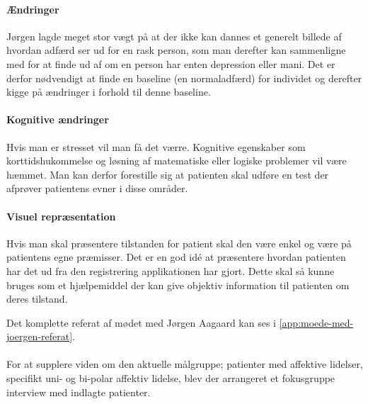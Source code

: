 \paragraph{Ændringer}
Jørgen lagde meget stor vægt på at der ikke kan dannes et generelt billede af hvordan adfærd ser ud for en rask person, som man derefter kan sammenligne med for at finde ud af om en person har enten depression eller mani.
Det er derfor nødvendigt at finde en baseline (en normaladfærd) for individet og derefter kigge på ændringer i forhold til denne baseline.

\paragraph{Kognitive ændringer}
Hvis man er stresset vil man få det værre. 
Kognitive egenskaber som korttidshukommelse og løsning af matematiske eller logiske problemer vil være hæmmet.
Man kan derfor forestille sig at patienten skal udføre en test der afprøver patientens evner i disse områder.

\paragraph{Visuel repræsentation}
Hvis man skal præsentere tilstanden for patient skal den være enkel og være på patientens egne præmisser. Det er en god idé at præsentere hvordan patienten har det ud fra den registrering applikationen har gjort. Dette skal så kunne bruges som et hjælpemiddel der kan give objektiv information til patienten om deres tilstand.

Det komplette referat af mødet med Jørgen Aagaard kan ses i \cref{app:moede-med-joergen-referat}.

\paragraph{}
For at supplere viden om den aktuelle målgruppe; patienter med affektive lidelser, specifikt uni- og bi-polar affektiv lidelse, blev der arrangeret et fokusgruppe interview med indlagte patienter.
